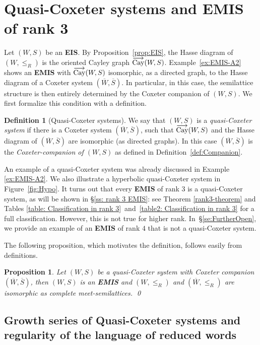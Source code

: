 \documentclass[A4paper, oneside]{amsart}
\newcommand{\oCay}{%
  \operatorname{%
    \overset{\smash{\raisebox{-0.45ex}{$\longrightarrow$}}}{\textnormal{Cay}}%
  }%
}
\newcommand{\EIS}{\textnormal{\bf EIS}\xspace}
\newcommand{\EMIS}{\textnormal{\bf EMIS}\xspace}
\newtheorem{prop}[thm]{Proposition}
\theoremstyle{definition}
\newtheorem{defi}[thm]{Definition}
\begin{document}
\section{Quasi-Coxeter systems and \EMIS of rank 3} 
\label{Rank 3 section}

Let $(W,S)$ be an \EIS. By Proposition~\ref{prop:EIS}, the Hasse diagram of $(W,\leq_R)$ is the oriented Cayley graph $\oCay(W,S)$. Example~\ref{ex:EMIS-A2} shows an \EMIS with  $\oCay(W,S)$ isomorphic, as a directed graph, to the Hasse diagram of a Coxeter system $(\overline W,\overline S)$. In particular, in this case, the semilattice structure is then entirely determined by the Coxeter companion of $(W,S)$. We first formalize this condition with a definition. 

\begin{defi}[Quasi-Coxeter systems] We say that $(W,S)$ is a {\em quasi-Coxeter system} if there is a Coxeter system $(\overline W,\overline S)$, such that $\oCay(W,S)$ and the Hasse diagram of $(\overline W,\overline S)$ are isomorphic (as directed graphs). In this case $(\overline W,\overline S)$ is the {\em Coxeter-companion of $(W,S)$} as defined in Definition~\ref{def:Companion}. 
\end{defi}

An example of a quasi-Coxeter system was already discussed in Example \ref{ex:EMIS-A2}. We also illustrate a hyperbolic quasi-Coxeter system in Figure~\ref{fig:Hypo}. It turns out that every \EMIS of rank 3 is a quasi-Coxeter system, as will be shown in \S\ref{ss: rank 3 EMIS}: see Theorem \ref{rank3-theorem} and Tables \ref{table: Classification in rank 3}~and~\ref{table2: Classification in rank 3} for a full classification.    However, this is not true for higher rank. In~\S\ref{se:FurtherOpen}, we provide an example of an \EMIS of rank $4$ that is not a quasi-Coxeter system. 

The following proposition, which motivates the definition, follows easily from definitions.

\begin{prop}\label{prop:QuasiCoxeter} Let $(W,S)$ be a quasi-Coxeter system with Coxeter companion $(\overline{W},\overline{S})$, then $(W,S)$ is an \EMIS and $(W,\leq_R)$ and $(\overline{W},\leq_R)$ are isomorphic as complete meet-semilattices.  \qed
\end{prop}


\subsection{Growth series of Quasi-Coxeter systems and regularity of the language of reduced words}
\label{ss:Growth}
\end{document}
